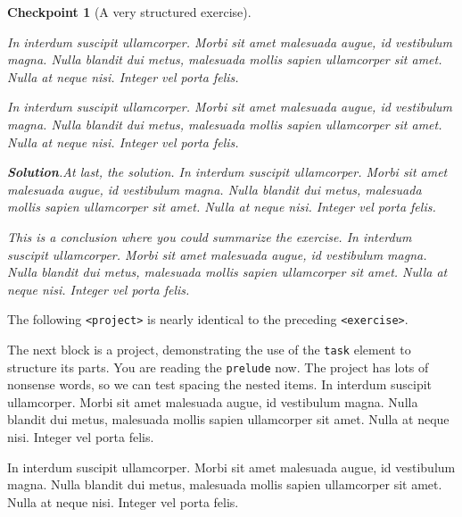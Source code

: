 \documentclass{sn-jnl}
\theoremstyle{thmstyleone}%
\theoremstyle{thmstyletwo}%
\newtheorem{inlineexercise}[theorem]{Checkpoint}
\theoremstyle{thmstylethree}%
\newcommand{\blocktitlefont}{\relax}
\newcommand{\mono}[1]{\texttt{#1}}
\numberwithin{equation}{section}
\begin{document}
\begin{inlineexercise}[A very structured exercise]
\begin{enumerate}[font=\bfseries,label=(\alph*),ref=\alph*]
\par
In interdum suscipit ullamcorper. Morbi sit amet malesuada augue, id vestibulum magna. Nulla blandit dui metus, malesuada mollis sapien ullamcorper sit amet. Nulla at neque nisi. Integer vel porta felis.%
\par
In interdum suscipit ullamcorper. Morbi sit amet malesuada augue, id vestibulum magna. Nulla blandit dui metus, malesuada mollis sapien ullamcorper sit amet. Nulla at neque nisi. Integer vel porta felis.%
\par\smallskip%
\noindent\textbf{\blocktitlefont Solution}.\hypertarget{exercise-structured-6-5}{}\quad{}At last, the solution.  In interdum suscipit ullamcorper. Morbi sit amet malesuada augue, id vestibulum magna. Nulla blandit dui metus, malesuada mollis sapien ullamcorper sit amet. Nulla at neque nisi. Integer vel porta felis.%
\end{enumerate}%
This is a conclusion where you could summarize the exercise.  In interdum suscipit ullamcorper. Morbi sit amet malesuada augue, id vestibulum magna. Nulla blandit dui metus, malesuada mollis sapien ullamcorper sit amet. Nulla at neque nisi. Integer vel porta felis.%
\end{inlineexercise}%
The following \mono{<project>} is nearly identical to the preceding \mono{<exercise>}.%
\par
The next block is a project, demonstrating the use of the \mono{task} element to structure its parts.  You are reading the \mono{prelude} now.  The project has lots of nonsense words, so we can test spacing the nested items.  In interdum suscipit ullamcorper. Morbi sit amet malesuada augue, id vestibulum magna. Nulla blandit dui metus, malesuada mollis sapien ullamcorper sit amet. Nulla at neque nisi. Integer vel porta felis.%
\par
In interdum suscipit ullamcorper. Morbi sit amet malesuada augue, id vestibulum magna. Nulla blandit dui metus, malesuada mollis sapien ullamcorper sit amet. Nulla at neque nisi. Integer vel porta felis.%
\end{document}
